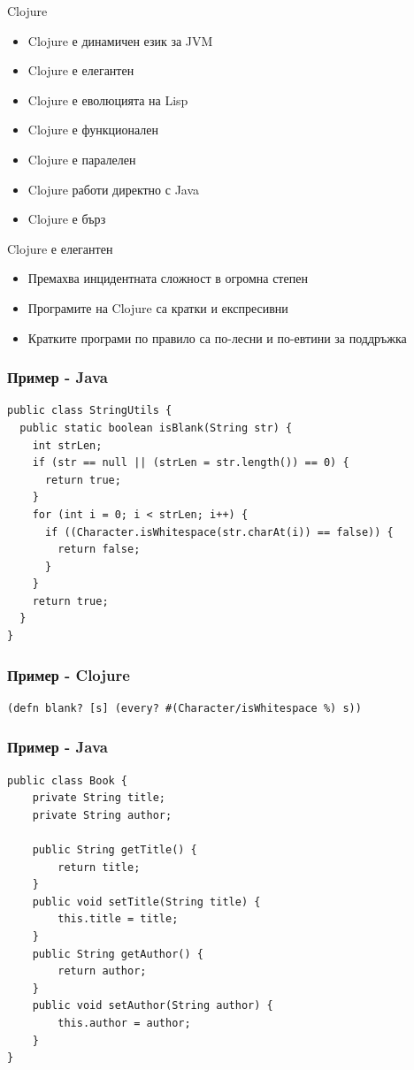 \documentclass[compress,red]{beamer}
\begin{document}
\begin{frame}{Clojure}
  \transdissolve
  \begin{itemize}
  \item Clojure е динамичен език за JVM
  \item Clojure е елегантен
  \item Clojure е еволюцията на Lisp
  \item Clojure е функционален
  \item Clojure е паралелен
  \item Clojure работи директно с Java
  \item Clojure е бърз
  \end{itemize}
\end{frame}

\begin{frame}{Clojure е елегантен}
  \transdissolve
  \begin{itemize}
  \item Премахва инцидентната сложност в огромна степен
  \item Програмите на Clojure са кратки и експресивни
  \item Кратките програми по правило са по-лесни и по-евтини за поддръжка
  \end{itemize}
\end{frame}

\begin{frame}[fragile]
  \frametitle{Пример - Java}
  \transdissolve
\begin{lstlisting}
public class StringUtils {
  public static boolean isBlank(String str) {
    int strLen;
    if (str == null || (strLen = str.length()) == 0) {
      return true;
    }
    for (int i = 0; i < strLen; i++) {
      if ((Character.isWhitespace(str.charAt(i)) == false)) {
        return false;
      }
    }
    return true;
  }
}
\end{lstlisting}
\end{frame}

\begin{frame}[fragile]
  \frametitle{Пример - Clojure}
  \transdissolve
\begin{lstlisting}
(defn blank? [s] (every? #(Character/isWhitespace %) s))
\end{lstlisting}
\end{frame}

\begin{frame}[fragile]
  \frametitle{Пример - Java}
  \transdissolve
\begin{lstlisting}
public class Book {
    private String title;
    private String author;

    public String getTitle() {
        return title;
    }
    public void setTitle(String title) {
        this.title = title;
    }
    public String getAuthor() {
        return author;
    }
    public void setAuthor(String author) {
        this.author = author;
    }
}  
\end{lstlisting}
\end{frame}
\end{document}
